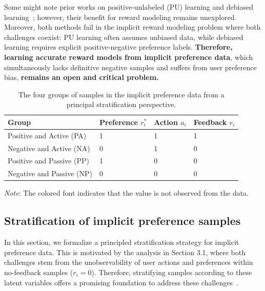 \documentclass[]{arxiv_singlecolumn}
\theoremstyle{plain}
\theoremstyle{definition}
\theoremstyle{remark}
\begin{document}
Some might note prior works on positive-unlabeled (PU) learning and debiased learning~\citep{distpu,li2023stabledr}; however, their benefit for reward modeling remains unexplored. Moreover, both methods fail in the implicit reward modeling problem where both challenges coexist: PU learning often assumes unbiased data, while debiased learning requires explicit positive-negative preference labels. \textbf{Therefore, learning accurate reward models from implicit preference data}, which simultaneously lacks definitive negative samples and suffers from user preference bias, \textbf{remains an open and critical problem.}

\begin{table}[]
    \centering\small
    \caption{The four groups of samples in the implicit preference data from a principal stratification perspective.}
    \setlength{\tabcolsep}{30pt} 
    \renewcommand{\arraystretch}{1}
    \begin{tabular}{llll}
    \toprule
        Group & Preference $r^*_i$ & Action $a_i$ & Feedback $r_i$ \\
        \midrule
        Positive and Active (PA) & 1 & 1 & 1 \\
        Negative and Active (NA)  & \textcolor{xiaoxiblue}{0} & \textcolor{xiaoxiblue}{1} & 0 \\
        Positive and Passive (PP) & \textcolor{xiaoxiblue}{1} & \textcolor{xiaoxiblue}{0} & 0 \\
        Negative and Passive (NP) & \textcolor{xiaoxiblue}{0} & \textcolor{xiaoxiblue}{0} & 0 \\
        \bottomrule
    \end{tabular}
    \begin{tablenotes}
    \item \scriptsize \textit{Note}: The \textcolor{xiaoxiblue}{colored} font indicates that the value is not observed from the data.
\end{tablenotes}
    \label{tab:group}
\end{table}

\subsection{Stratification of implicit preference samples}
In this section, we formalize a principled stratification strategy for implicit preference data. This is motivated by the analysis in Section 3.1, where both challenges stem from the unobservability of user actions and preferences within no-feedback samples ($r_i=0$). Therefore, stratifying samples according to these latent variables offers a promising foundation to address these challenges~\citep{Recrec}.
\end{document}
